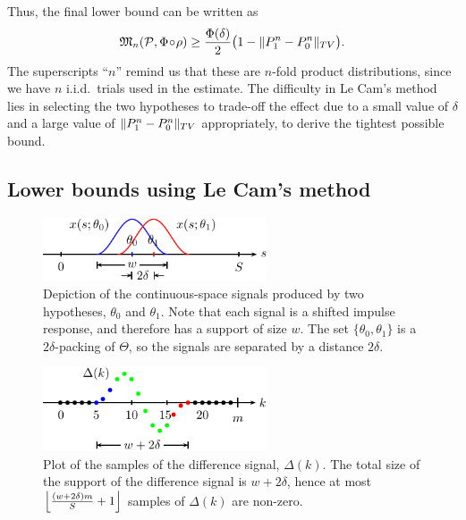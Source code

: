 \documentclass[conference]{IEEEtran}
\DeclarePairedDelimiter\norm{\lVert}{\rVert}
\DeclarePairedDelimiter\floor{\lfloor}{\rfloor}
\newcommand{\Phiorho}{\Phi\!\circ\!\rho}
\begin{document}
Thus, the final lower bound can be written as
\begin{equation} \label{eq:le-cam-bound}
	\mathfrak{M}_n(\mathcal P, \Phiorho) \geq \frac{\Phi(\delta)}{2} \big(1 - \norm{P_1^n - P_0^n}_{TV}\big).
\end{equation}
The superscripts ``$n$'' remind us that these are $n$-fold product
distributions, since we have $n$ i.i.d.\ trials used in the estimate.  The
difficulty in Le Cam's method lies in selecting the two hypotheses to trade-off
the effect due to a small value of $\delta$ and a large value of $\norm{P_1^n -
P_0^n}_{TV}$ appropriately, to derive the tightest possible bound.

\subsection{Lower bounds using Le Cam's method}
\label{sec:lecam-lb}

\begin{figure}[t]
	\centering
	\includegraphics[width=2.6in]{overlap-middle-pics}
	\caption{Depiction of the continuous-space signals produced by two
		hypotheses, $\theta_0$ and $\theta_1$. Note that each signal is a
		shifted impulse response, and therefore has a support of size $w$.
		The set $\{\theta_0, \theta_1\}$ is a $2\delta$-packing of
		$\Theta$, so the signals are separated by a distance $2\delta$.}
	\label{fig:overlap-middle}
\end{figure}
\begin{figure}[t]
	\centering
	\includegraphics[width=2.6in]{delta-sampled-pics}
	\caption{Plot of the samples of the difference signal, $\Delta(k)$. The
		total size of the support of the difference signal is $w+2\delta$,
		hence at most $\floor*{\frac{(w + 2\delta)m}{S} + 1}$ samples of
		$\Delta(k)$ are non-zero.}
	\label{fig:delta-sampled}
\end{figure}
\end{document}
